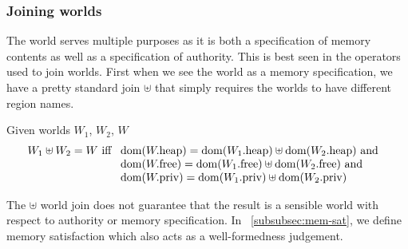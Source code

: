 \begin{jversion}


\subsubsection{Joining worlds}
\label{subsubsec:joining-worlds}
The world serves multiple purposes as it is both a specification of memory contents as well as a specification of authority.
This is best seen in the operators used to join worlds.
First when we see the world as a memory specification, we have a pretty standard join $\uplus$ that simply requires the worlds to have different region names.\begin{definition}
  Given worlds $W_1$, $W_2$, $W$
  \[
    W_1 \uplus W_2 = W
    \text{ iff }
    \begin{array}[t]{l}
      \dom(\pwheap) = \dom(\pwheap[W_1]) \uplus \dom(\pwheap[W_2]) \tand \\
      \dom(\pwfree) = \dom(\pwfree[W_1]) \uplus \dom(\pwfree[W_2]) \tand \\
      \dom(\pwpriv) = \dom(\pwpriv[W_1]) \uplus \dom(\pwpriv[W_2]) \\
    \end{array}
  \]
\end{definition}
The $\uplus$ world join does not guarantee that the result is a sensible world with respect to authority or memory specification.
In \sectionname~\ref{subsubsec:mem-sat}, we define memory satisfaction which also acts as a well-formedness judgement.


\end{jversion}

